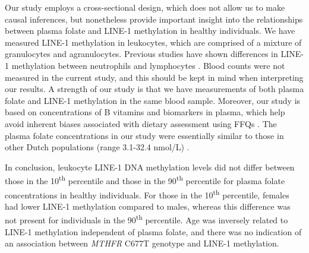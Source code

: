\noindent Our study employs a cross-sectional design, which does not allow us to make causal inferences, but nonetheless provide important insight into the relationships between plasma folate and LINE-1 methylation in healthy individuals. We have measured LINE-1 methylation in leukocytes, which are comprised of a mixture of granulocytes and agranulocytes. Previous studies have shown differences in LINE-1 methylation between neutrophils and lymphocytes \cite{c310}. Blood counts were not measured in the current study, and this should be kept in mind when interpreting our results. A strength of our study is that we have measurements of both plasma folate and LINE-1 methylation in the same blood sample. Moreover, our study is based on concentrations of B vitamins and biomarkers in plasma, which help avoid inherent biases associated with dietary assessment using FFQs \cite{c320}. The plasma folate concentrations in our study were essentially similar to those in other Dutch populations (range 3.1-32.4 nmol/L) \cite{c319,c336}.

\noindent In conclusion, leukocyte LINE-1 DNA methylation levels did not differ between those in the 10\textsuperscript{th} percentile and those in the 90\textsuperscript{th} percentile for plasma folate concentrations in healthy individuals. For those in the 10\textsuperscript{th} percentile, females had lower LINE-1 methylation compared to males, whereas this difference was not present for individuals in the 90\textsuperscript{th} percentile. Age was inversely related to LINE-1 methylation independent of plasma folate, and there was no indication of an association between \emph{MTHFR} C677T genotype and LINE-1 methylation. 
 
